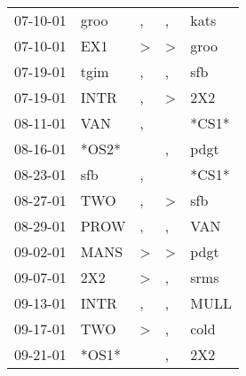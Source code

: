 \begin{supertabular}{p{0.07\textwidth}p{0.06\textwidth}p{0.02\textwidth}p{0.02\textwidth}p{0.06\textwidth}}
          07-10-01\textsuperscript{} &           groo\textsuperscript{} &                , &                , &           kats\textsuperscript{} \\
          07-10-01\textsuperscript{} &            EX1\textsuperscript{} &     \textgreater &     \textgreater &           groo\textsuperscript{} \\
          07-19-01\textsuperscript{} &           tgim\textsuperscript{} &                , &                , &            sfb\textsuperscript{} \\
          07-19-01\textsuperscript{} &           INTR\textsuperscript{} &                , &     \textgreater &            2X2\textsuperscript{} \\
          08-11-01\textsuperscript{} &            VAN\textsuperscript{} &                , &                  &                            *CS1* \\
          08-16-01\textsuperscript{} &                            *OS2* &                  &                , &           pdgt\textsuperscript{} \\
          08-23-01\textsuperscript{} &            sfb\textsuperscript{} &                , &                  &                            *CS1* \\
          08-27-01\textsuperscript{} &            TWO\textsuperscript{} &                , &     \textgreater &            sfb\textsuperscript{} \\
          08-29-01\textsuperscript{} &           PROW\textsuperscript{} &                , &                , &            VAN\textsuperscript{} \\
          09-02-01\textsuperscript{} &           MANS\textsuperscript{} &     \textgreater &     \textgreater &           pdgt\textsuperscript{} \\
          09-07-01\textsuperscript{} &            2X2\textsuperscript{} &     \textgreater &                , &           srms\textsuperscript{} \\
          09-13-01\textsuperscript{} &           INTR\textsuperscript{} &                , &                , &           MULL\textsuperscript{} \\
          09-17-01\textsuperscript{} &            TWO\textsuperscript{} &     \textgreater &                , &           cold\textsuperscript{} \\
          09-21-01\textsuperscript{} &                            *OS1* &                  &                , &            2X2\textsuperscript{} \\

\end{supertabular}
